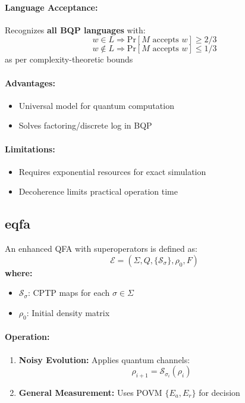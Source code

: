 \paragraph{Language Acceptance:}
Recognizes \textbf{all BQP languages} \cite{shor1994algorithms} with:
\[
w \in L \Rightarrow \text{Pr}[M \text{ accepts } w] \geq 2/3
\]
\[
w \notin L \Rightarrow \text{Pr}[M \text{ accepts } w] \leq 1/3
\]
as per complexity-theoretic bounds \cite{nielsen2010quantum}

\paragraph{Advantages:}
\begin{itemize}
    \item Universal model for quantum computation
    \item Solves factoring/discrete log in BQP
\end{itemize}

\paragraph{Limitations:}
\begin{itemize}
    \item Requires exponential resources for exact simulation
    \item Decoherence limits practical operation time
\end{itemize}

\subsection{\acrfull{eqfa}}
\label{subsec:eqfa}

\begin{definition}
An enhanced QFA with superoperators is defined as:
\[
\mathcal{E} = (\Sigma, Q, \{\mathcal{S}_\sigma\}, \rho_0, F)
\]
\textbf{where:}
\begin{itemize}
    \item $\mathcal{S}_\sigma$: CPTP maps for each $\sigma \in \Sigma$
    \item $\rho_0$: Initial density matrix
\end{itemize}
\end{definition}

\paragraph{Operation:}
\begin{enumerate}
    \item \textbf{Noisy Evolution:} Applies quantum channels:
    \[
    \rho_{i+1} = \mathcal{S}_{\sigma_i}(\rho_i)
    \]
    \item \textbf{General Measurement:} Uses POVM $\{E_a, E_r\}$ for decision
\end{enumerate}

